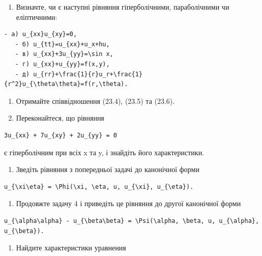 \documentclass[
  ukrainian,
]{article}
\providecommand{\tightlist}{%
  \setlength{\itemsep}{0pt}\setlength{\parskip}{0pt}}
\begin{document}
\begin{enumerate}
\def\labelenumi{\arabic{enumi}.}
\tightlist
\item
  Визначте, чи є наступні рівняння гіперболічними, параболічними чи
  еліптичними:
\end{enumerate}

\begin{verbatim}
- a) u_{xx}u_{xy}=0,
   - б) u_{tt}=u_{xx}+u_x+hu,
   - в) u_{xx}+3u_{yy}=\sin x,
   - г) u_{xx}+u_{yy}=f(x,y),
   - д) u_{rr}+\frac{1}{r}u_r+\frac{1}{r^2}u_{\theta\theta}=f(r,\theta).
\end{verbatim}

\begin{enumerate}
\def\labelenumi{\arabic{enumi}.}
\setcounter{enumi}{1}
\item
  Отримайте співвідношення (23.4), (23.5) та (23.6).
\item
  Переконайтеся, що рівняння
\end{enumerate}

\begin{verbatim}
3u_{xx} + 7u_{xy} + 2u_{yy} = 0
\end{verbatim}

є гіперболічним при всіх x та y, і знайдіть його характеристики.

\begin{enumerate}
\def\labelenumi{\arabic{enumi}.}
\setcounter{enumi}{3}
\tightlist
\item
  Зведіть рівняння з попередньої задачі до канонічної форми
\end{enumerate}

\begin{verbatim}
u_{\xi\eta} = \Phi(\xi, \eta, u, u_{\xi}, u_{\eta}).
\end{verbatim}

\begin{enumerate}
\def\labelenumi{\arabic{enumi}.}
\setcounter{enumi}{4}
\tightlist
\item
  Продовжте задачу 4 і приведіть це рівняння до другої канонічної форми
\end{enumerate}

\begin{verbatim}
u_{\alpha\alpha} - u_{\beta\beta} = \Psi(\alpha, \beta, u, u_{\alpha}, u_{\beta}).
\end{verbatim}

\begin{enumerate}
\def\labelenumi{\arabic{enumi}.}
\setcounter{enumi}{5}
\tightlist
\item
  Найдите характеристики уравнения
\end{enumerate}
\end{document}
